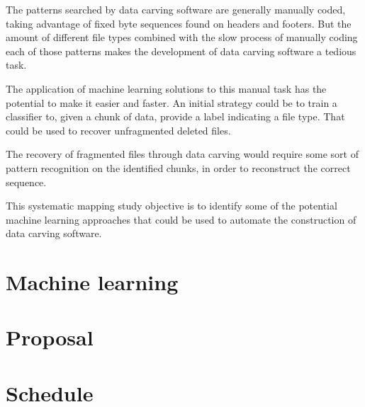 The patterns searched by data carving software are generally manually coded, taking advantage of fixed byte sequences found on headers and footers. But the amount of different file types combined with the slow process of manually coding each of those patterns makes the development of data carving software a tedious task.

The application of machine learning solutions to this manual task has the potential to make it easier and faster. An initial strategy could be to train a classifier to, given a chunk of data, provide a label indicating a file type. That could be used to recover unfragmented deleted files.

The recovery of fragmented files through data carving would require some sort of pattern recognition on the identified chunks, in order to reconstruct the correct sequence.

This systematic mapping study objective is to identify some of the potential machine learning approaches that could be used to automate the construction of data carving software.

\chapter{Machine learning}

\chapter{Proposal}

\chapter{Schedule}
